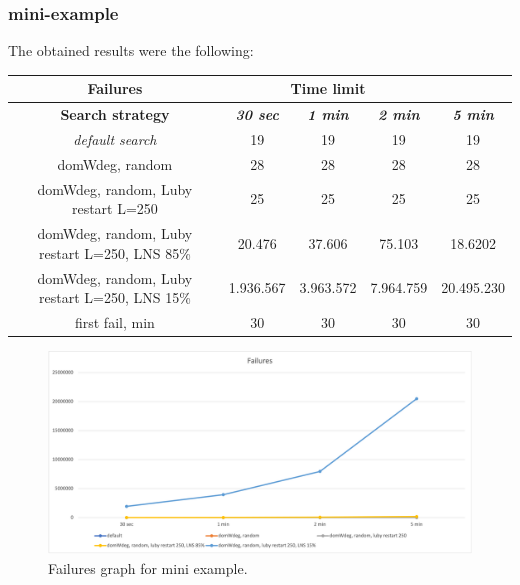 \subsubsection{mini-example}
The obtained results were the following:
{
\renewcommand{\arraystretch}{2}
\begin{longtable}[h]{| c | c | c | c | c |}
    \hline
    \textbf{Failures} & \multicolumn{3}{c}{Time limit} & \\
    \hline
    \textbf{Search strategy} & \textbf{\textit{30 sec}} & \textbf{\textit{1 min}} & \textbf{\textit{2 min}} & \textbf{\textit{5 min}} \\
    \hline
    \endhead
    \textit{default search}                       &      19 &      19 &      19 &       19 \\
    \hline
    domWdeg, random                               &      28 &      28 &      28 &       28 \\
    \hline
    domWdeg, random, Luby restart L=250           &      25 &      25 &      25 &       25 \\
    \hline
    domWdeg, random, Luby restart L=250, LNS 85\% &   20.476 &   37.606 &   75.103 &   18.6202 \\
    \hline
    domWdeg, random, Luby restart L=250, LNS 15\% & 1.936.567 & 3.963.572 & 7.964.759 & 20.495.230 \\
    \hline
    first fail, min                               &      30 &      30 &      30 &       30 \\
    \hline
\end{longtable}
}
\begin{figure}[H]
    \centering
    \includegraphics[width=1.0\columnwidth]{../graphs/mini-example-failures.png}
    \caption{Failures graph for mini example.}
\end{figure}
